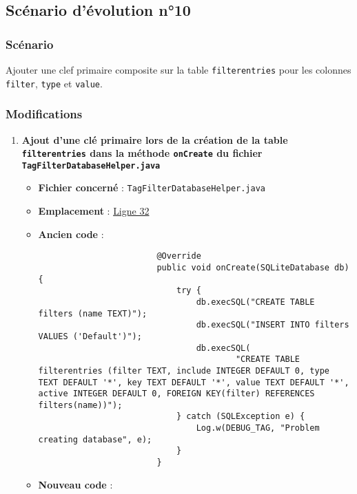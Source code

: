 \subsection{Scénario d'évolution n°10}
\subsubsection{Scénario}
Ajouter une clef primaire composite sur la table \texttt{filterentries} pour les colonnes \texttt{filter}, \texttt{type} et \texttt{value}.

\subsubsection{Modifications}
\begin{enumerate}
    \item \textbf{Ajout d'une clé primaire lors de la création de la table \texttt{filterentries} dans la méthode \texttt{onCreate} du fichier \texttt{TagFilterDatabaseHelper.java}}
          \begin{itemize}
              \item \textbf{Fichier concerné} : \texttt{TagFilterDatabaseHelper.java}
              \item \textbf{Emplacement} :
                    \href{https://github.com/MarcusWolschon/osmeditor4android/blob/master/src/main/java/de/blau/android/filter/TagFilterDatabaseHelper.java#L32 }{Ligne 32}
              \item \textbf{Ancien code} :
                    \begin{verbatim}
                        @Override
                        public void onCreate(SQLiteDatabase db) {
                            try {
                                db.execSQL("CREATE TABLE filters (name TEXT)");
                                db.execSQL("INSERT INTO filters VALUES ('Default')");
                                db.execSQL(
                                        "CREATE TABLE filterentries (filter TEXT, include INTEGER DEFAULT 0, type TEXT DEFAULT '*', key TEXT DEFAULT '*', value TEXT DEFAULT '*', active INTEGER DEFAULT 0, FOREIGN KEY(filter) REFERENCES filters(name))");
                            } catch (SQLException e) {
                                Log.w(DEBUG_TAG, "Problem creating database", e);
                            }
                        }
                    \end{verbatim}
              \item \textbf{Nouveau code} :

\end{itemize}
\end{enumerate}
